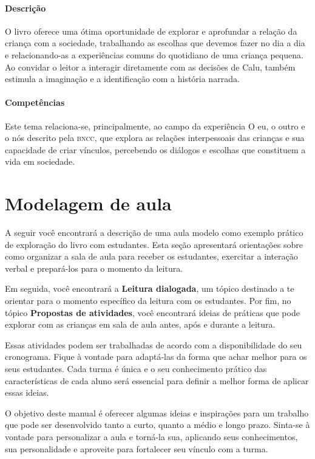 \documentclass[11pt]{extarticle}
\begin{document}
\paragraph{Descrição} O livro oferece uma ótima oportunidade de explorar 
e aprofundar a relação da criança com a sociedade, trabalhando as escolhas que devemos fazer no dia a dia e relacionando-as a experiências comuns do quotidiano de uma criança pequena. Ao convidar o leitor a interagir diretamente com as decisões de Calu, também estimula a imaginação e a identificação com a história narrada.

\paragraph{Competências} Este tema relaciona-se, principalmente, ao 
campo da experiência O eu, o outro e o nós 
descrito pela \textsc{bncc}, que explora as relações interpessoais das crianças e sua capacidade de criar vínculos, percebendo os diálogos e escolhas que constituem a vida em sociedade.


\section{Modelagem de aula}
A seguir você encontrará a descrição de uma aula modelo como exemplo 
prático de exploração do livro com estudantes. Esta seção apresentará 
orientações sobre como organizar a sala de aula para receber os 
estudantes, exercitar a interação verbal e prepará-los para o 
momento da leitura.

Em seguida, você encontrará a \textbf{Leitura dialogada}, um 
tópico destinado a te orientar para o momento específico da 
leitura com os estudantes. Por fim, no tópico 
\textbf{Propostas de atividades}, você encontrará ideias 
de práticas que pode explorar com as crianças em sala de 
aula antes, após e durante a leitura. 

Essas atividades podem ser trabalhadas de acordo com a 
disponibilidade do seu cronograma. Fique à vontade para adaptá-las 
da forma que achar melhor para os seus estudantes. Cada turma é única 
e o seu conhecimento prático das características de cada aluno será 
essencial para definir a melhor forma de aplicar essas ideias. 

O objetivo deste manual é oferecer algumas ideias 
e inspirações para um trabalho que pode ser desenvolvido tanto 
a curto, quanto a médio e longo prazo. Sinta-se à vontade para 
personalizar a aula e torná-la sua, aplicando seus conhecimentos, sua 
personalidade e aproveite para fortalecer 
seu vínculo com a turma.
\end{document}
